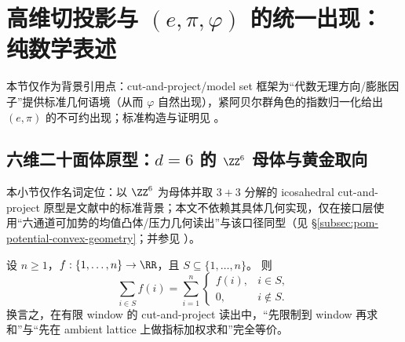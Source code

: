 \section{高维切投影与 \texorpdfstring{$(e,\pi,\varphi)$}{(e, pi, varphi)} 的统一出现：纯数学表述}\label{sec:high-dimensional-cut-project}

本节仅作为背景引用点：cut-and-project/model set 框架为“代数无理方向/膨胀因子”提供标准几何语境（从而 \(\varphi\) 自然出现），紧阿贝尔群角色的指数归一化给出 \((e,\pi)\) 的不可约出现；标准构造与证明见 \cite{BaakeGrimmAperiodicOrder1,MeyerAlgebraicNumbers,QueffelecSubstitution}。

\subsection{六维二十面体原型：\texorpdfstring{$d=6$}{d=6} 的 \texorpdfstring{$\ZZ^6$}{Z6} 母体与黄金取向}\label{subsec:icosahedral-6d-model-set}
本小节仅作名词定位：以 \(\ZZ^6\) 为母体并取 \(3{+}3\) 分解的 icosahedral cut-and-project 原型是文献中的标准背景；本文不依赖其具体几何实现，仅在接口层使用“六通道可加势的均值凸体/压力几何读出”与该口径同型（见 \S\ref{subsec:pom-potential-convex-geometry}；并参见 \cite{BaakeGrimmAperiodicOrder1,MeyerAlgebraicNumbers,QueffelecSubstitution}）。

\begin{corollary}[窗口指标把子集和改写为环境全集上的条件和]\label{cor:high-dimensional-cut-project-indicator-sum-rewrite}
设 \(n\ge 1\)，\(f:\{1,\dots,n\}\to\RR\)，且 \(S\subseteq\{1,\dots,n\}\)。
则
\[
\sum_{i\in S} f(i)
=
\sum_{i=1}^{n}
\begin{cases}
f(i), & i\in S,\\
0, & i\notin S.
\end{cases}
\]
换言之，在有限 window 的 cut-and-project 读出中，“先限制到 window 再求和”与“先在 ambient lattice 上做指标加权求和”完全等价。
\end{corollary}


